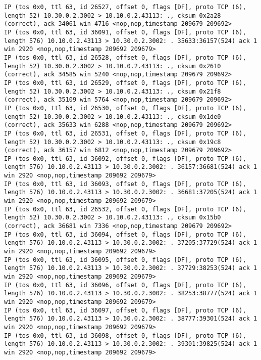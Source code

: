 \documentclass[a4paper,12pt]{article}
\begin{document}
\begin{lstlisting}
IP (tos 0x0, ttl 63, id 26527, offset 0, flags [DF], proto TCP (6), length 52) 10.30.0.2.3002 > 10.10.0.2.43113: ., cksum 0x2a28 (correct), ack 34061 win 4716 <nop,nop,timestamp 209679 209692>
IP (tos 0x0, ttl 63, id 36091, offset 0, flags [DF], proto TCP (6), length 576) 10.10.0.2.43113 > 10.30.0.2.3002: . 35633:36157(524) ack 1 win 2920 <nop,nop,timestamp 209692 209679>
IP (tos 0x0, ttl 63, id 26528, offset 0, flags [DF], proto TCP (6), length 52) 10.30.0.2.3002 > 10.10.0.2.43113: ., cksum 0x2610 (correct), ack 34585 win 5240 <nop,nop,timestamp 209679 209692>
IP (tos 0x0, ttl 63, id 26529, offset 0, flags [DF], proto TCP (6), length 52) 10.30.0.2.3002 > 10.10.0.2.43113: ., cksum 0x21f8 (correct), ack 35109 win 5764 <nop,nop,timestamp 209679 209692>
IP (tos 0x0, ttl 63, id 26530, offset 0, flags [DF], proto TCP (6), length 52) 10.30.0.2.3002 > 10.10.0.2.43113: ., cksum 0x1de0 (correct), ack 35633 win 6288 <nop,nop,timestamp 209679 209692>
IP (tos 0x0, ttl 63, id 26531, offset 0, flags [DF], proto TCP (6), length 52) 10.30.0.2.3002 > 10.10.0.2.43113: ., cksum 0x19c8 (correct), ack 36157 win 6812 <nop,nop,timestamp 209679 209692>
IP (tos 0x0, ttl 63, id 36092, offset 0, flags [DF], proto TCP (6), length 576) 10.10.0.2.43113 > 10.30.0.2.3002: . 36157:36681(524) ack 1 win 2920 <nop,nop,timestamp 209692 209679>
IP (tos 0x0, ttl 63, id 36093, offset 0, flags [DF], proto TCP (6), length 576) 10.10.0.2.43113 > 10.30.0.2.3002: . 36681:37205(524) ack 1 win 2920 <nop,nop,timestamp 209692 209679>
IP (tos 0x0, ttl 63, id 26532, offset 0, flags [DF], proto TCP (6), length 52) 10.30.0.2.3002 > 10.10.0.2.43113: ., cksum 0x15b0 (correct), ack 36681 win 7336 <nop,nop,timestamp 209679 209692>
IP (tos 0x0, ttl 63, id 36094, offset 0, flags [DF], proto TCP (6), length 576) 10.10.0.2.43113 > 10.30.0.2.3002: . 37205:37729(524) ack 1 win 2920 <nop,nop,timestamp 209692 209679>
IP (tos 0x0, ttl 63, id 36095, offset 0, flags [DF], proto TCP (6), length 576) 10.10.0.2.43113 > 10.30.0.2.3002: . 37729:38253(524) ack 1 win 2920 <nop,nop,timestamp 209692 209679>
IP (tos 0x0, ttl 63, id 36096, offset 0, flags [DF], proto TCP (6), length 576) 10.10.0.2.43113 > 10.30.0.2.3002: . 38253:38777(524) ack 1 win 2920 <nop,nop,timestamp 209692 209679>
IP (tos 0x0, ttl 63, id 36097, offset 0, flags [DF], proto TCP (6), length 576) 10.10.0.2.43113 > 10.30.0.2.3002: . 38777:39301(524) ack 1 win 2920 <nop,nop,timestamp 209692 209679>
IP (tos 0x0, ttl 63, id 36098, offset 0, flags [DF], proto TCP (6), length 576) 10.10.0.2.43113 > 10.30.0.2.3002: . 39301:39825(524) ack 1 win 2920 <nop,nop,timestamp 209692 209679>

\end{lstlisting}
\end{document}
